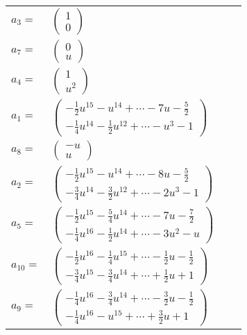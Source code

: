 \documentclass[1p]{elsarticle_modified}
\theoremstyle{definition}
\begin{document}
\begin{tabular}{m{7pt} m{180pt} m{7pt} m{180pt} }
\flushright $a_{3}=$&$\begin{pmatrix}1\\0\end{pmatrix}$ \\
\flushright $a_{7}=$&$\begin{pmatrix}0\\u\end{pmatrix}$ \\
\flushright $a_{4}=$&$\begin{pmatrix}1\\u^2\end{pmatrix}$ \\
\flushright $a_{1}=$&$\begin{pmatrix}-\frac{1}{2} u^{15}- u^{14}+\cdots-7 u-\frac{5}{2}\\-\frac{1}{4} u^{14}-\frac{1}{2} u^{12}+\cdots- u^3-1\end{pmatrix}$ \\
\flushright $a_{8}=$&$\begin{pmatrix}- u\\u\end{pmatrix}$ \\
\flushright $a_{2}=$&$\begin{pmatrix}-\frac{1}{2} u^{15}- u^{14}+\cdots-8 u-\frac{5}{2}\\-\frac{3}{4} u^{14}-\frac{3}{2} u^{12}+\cdots-2 u^3-1\end{pmatrix}$ \\
\flushright $a_{5}=$&$\begin{pmatrix}-\frac{1}{2} u^{15}-\frac{5}{4} u^{14}+\cdots-7 u-\frac{7}{2}\\-\frac{1}{4} u^{16}-\frac{1}{2} u^{14}+\cdots-3 u^2- u\end{pmatrix}$ \\
\flushright $a_{10}=$&$\begin{pmatrix}-\frac{1}{2} u^{16}-\frac{1}{4} u^{15}+\cdots-\frac{1}{2} u-\frac{1}{2}\\-\frac{3}{4} u^{15}-\frac{3}{4} u^{14}+\cdots+\frac{1}{2} u+1\end{pmatrix}$ \\
\flushright $a_{9}=$&$\begin{pmatrix}-\frac{1}{4} u^{16}-\frac{3}{4} u^{14}+\cdots-\frac{3}{2} u-\frac{1}{2}\\-\frac{1}{4} u^{16}- u^{15}+\cdots+\frac{3}{2} u+1\end{pmatrix}$ \\

\end{tabular}
\end{document}
